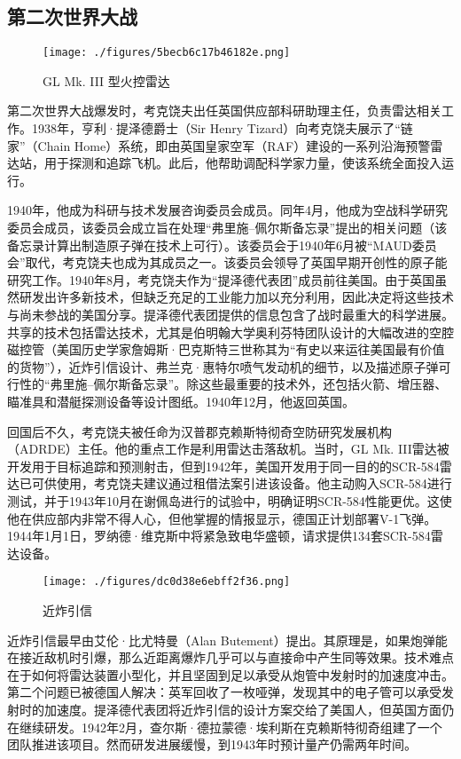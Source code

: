 \subsection{第二次世界大战}
\begin{figure}[ht]
\centering
\texttt{[image: ./figures/5becb6c17b46182e.png]}
\caption{GL Mk. III 型火控雷达} \label{fig_YHkrf_4}
\end{figure}
第二次世界大战爆发时，考克饶夫出任英国供应部科研助理主任，负责雷达相关工作。1938年，亨利·提泽德爵士（Sir Henry Tizard）向考克饶夫展示了“链家”（Chain Home）系统，即由英国皇家空军（RAF）建设的一系列沿海预警雷达站，用于探测和追踪飞机。此后，他帮助调配科学家力量，使该系统全面投入运行。

1940年，他成为科研与技术发展咨询委员会成员。同年4月，他成为空战科学研究委员会成员，该委员会成立旨在处理“弗里施–佩尔斯备忘录”提出的相关问题（该备忘录计算出制造原子弹在技术上可行）。该委员会于1940年6月被“MAUD委员会”取代，考克饶夫也成为其成员之一。该委员会领导了英国早期开创性的原子能研究工作。1940年8月，考克饶夫作为“提泽德代表团”成员前往美国。由于英国虽然研发出许多新技术，但缺乏充足的工业能力加以充分利用，因此决定将这些技术与尚未参战的美国分享。提泽德代表团提供的信息包含了战时最重大的科学进展。共享的技术包括雷达技术，尤其是伯明翰大学奥利芬特团队设计的大幅改进的空腔磁控管（美国历史学家詹姆斯·巴克斯特三世称其为“有史以来运往美国最有价值的货物”），近炸引信设计、弗兰克·惠特尔喷气发动机的细节，以及描述原子弹可行性的“弗里施–佩尔斯备忘录”。除这些最重要的技术外，还包括火箭、增压器、瞄准具和潜艇探测设备等设计图纸。1940年12月，他返回英国。

回国后不久，考克饶夫被任命为汉普郡克赖斯特彻奇空防研究发展机构（ADRDE）主任。他的重点工作是利用雷达击落敌机。当时，GL Mk. III雷达被开发用于目标追踪和预测射击，但到1942年，美国开发用于同一目的的SCR-584雷达已可供使用，考克饶夫建议通过租借法案引进该设备。他主动购入SCR-584进行测试，并于1943年10月在谢佩岛进行的试验中，明确证明SCR-584性能更优。这使他在供应部内非常不得人心，但他掌握的情报显示，德国正计划部署V-1飞弹。1944年1月1日，罗纳德·维克斯中将紧急致电华盛顿，请求提供134套SCR-584雷达设备。
\begin{figure}[ht]
\centering
\texttt{[image: ./figures/dc0d38e6ebff2f36.png]}
\caption{近炸引信} \label{fig_YHkrf_5}
\end{figure}
近炸引信最早由艾伦·比尤特曼（Alan Butement）提出。其原理是，如果炮弹能在接近敌机时引爆，那么近距离爆炸几乎可以与直接命中产生同等效果。技术难点在于如何将雷达装置小型化，并且坚固到足以承受从炮管中发射时的加速度冲击。第二个问题已被德国人解决：英军回收了一枚哑弹，发现其中的电子管可以承受发射时的加速度。提泽德代表团将近炸引信的设计方案交给了美国人，但英国方面仍在继续研发。1942年2月，查尔斯·德拉蒙德·埃利斯在克赖斯特彻奇组建了一个团队推进该项目。然而研发进展缓慢，到1943年时预计量产仍需两年时间。

